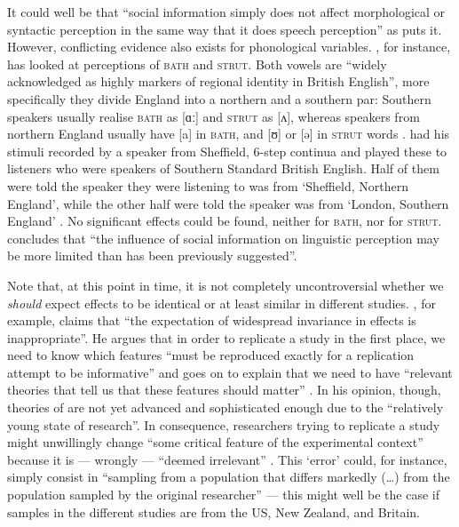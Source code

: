 It could well be that ``social information simply does not affect morphological or syntactic perception in the same way that it does speech perception'' as \textcite[229]{squires2013} puts it.
However, conflicting evidence also exists for phonological variables.
\textcite{lawrence2015}, for instance, has looked at perceptions of \textsc{bath} and \textsc{strut}.
Both vowels are ``widely acknowledged as highly  markers of regional identity in British English'', more specifically they divide England into a northern and a southern par: Southern speakers usually realise \textsc{bath} as [ɑː] and \textsc{strut} as [ʌ], whereas speakers from northern England usually have [a] in \textsc{bath}, and [ʊ] or [ə] in \textsc{strut} words \parencite[cf.][1]{lawrence2015}.
\citeauthor{lawrence2015} had his stimuli recorded by a speaker from Sheffield,  6-step  continua and played these to listeners who were speakers of Southern Standard British English.
Half of them were told the speaker they were listening to was from `Sheffield, Northern England', while the other half were told the speaker was from `London, Southern England' \parencite[cf.][2--3]{lawrence2015}.
No significant  effects could be found, neither for \textsc{bath}, nor for \textsc{strut}.
\textcite[cf.][4]{lawrence2015} concludes that ``the influence of social information on linguistic perception may be more limited than has been previously suggested''.

Note that, at this point in time, it is not completely uncontroversial whether we \emph{should} expect  effects to be identical or at least similar in different studies.
\textcite[45]{cesario2014}, for example, claims that ``the expectation of widespread invariance in  effects is inappropriate''.
He argues that in order to replicate a study in the first place, we need to know which features ``must be reproduced exactly for a replication attempt to be informative'' and goes on to explain that we need to have ``relevant theories that tell us that these features should matter'' \parencite[42]{cesario2014}.
In his opinion, though, theories of  are not yet advanced and sophisticated enough due to the ``relatively young state of  research''.
In consequence, researchers trying to replicate a study might unwillingly change ``some critical feature of the experimental context'' because it is --- wrongly --- ``deemed irrelevant'' \parencite[43]{cesario2014}.
This `error' could, for instance, simply consist in ``sampling from a population that differs markedly (\ldots) from the population sampled by the original researcher'' \parencite[43]{cesario2014} --- this might well be the case if samples in the different studies are from the US, New Zealand, and Britain.

